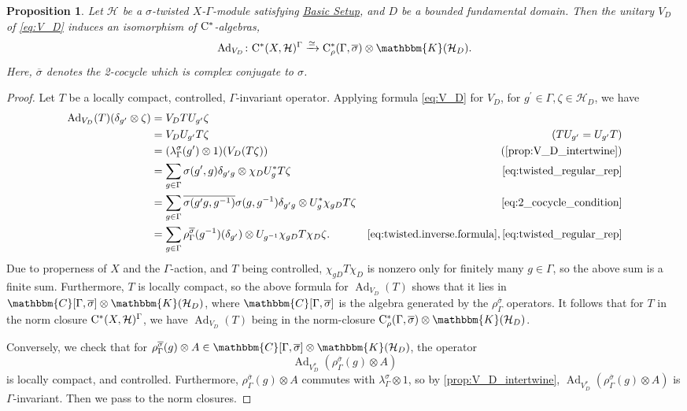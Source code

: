 \documentclass{amsart}
\numberwithin{figure}{section}
\numberwithin{equation}{section}
\numberwithin{table}{section}
\theoremstyle{plain}
\newtheorem{proposition}[equation]{Proposition}
\theoremstyle{definition}
\theoremstyle{remark}
\theoremstyle{nonumber}
\newcommand{\refbasicsetup}{\hyperref[basic_setup]{Basic Setup}}
\newcommand{\Cpt}{\mathbb{K}}
\newcommand{\Cst}{\relax\ifmmode\mathrm{C}^*\else\textup{C*}\fi}
\newcommand{\Cstr}{\Cst_\rho} %
\newcommand{\Ad}{\operatorname{Ad}} %
\renewcommand{\mathbb}{\mathbbm} %
\begin{document}
\begin{proposition}\label{prop:twisted_Willett}
Let $\mathcal{H}$ be a
$\sigma$-twisted $X$-$\Gamma$-module satisfying \refbasicsetup, 
and $D$ be a bounded fundamental domain. Then the unitary $V_D$ of
\eqref{eq:V_D}
induces an isomorphism of $\Cst$-algebras,
\begin{equation}\label{eq:Willett_isomorphism_twisted}
\Ad_{V_D}\colon \Cst(X,\mathcal{H})^\Gamma\xrightarrow{\simeq}
\Cstr(\Gamma,\overline{\sigma})\otimes\Cpt(\mathcal{H}_{D}).
\end{equation}
Here, $\overline{\sigma}$ denotes the 2-cocycle which is complex conjugate to $\sigma$.
\end{proposition}
\begin{proof}
Let $T$ be a locally compact, controlled, $\Gamma$-invariant operator.
Applying formula \eqref{eq:V_D} for $V_D$, for $g^\prime\in \Gamma,
\zeta\in \mathcal{H}_D$, we have
\begin{align*}
\Ad_{V_D}(T)(\delta_{g^\prime}\otimes\zeta)
&=V_D T U_{g^\prime}\zeta\\
&=V_D U_{g^\prime} T\zeta & (TU_{g^\prime}=U_{g^\prime}T)\\
&=(\lambda^\sigma_\Gamma(g^\prime)\otimes 1)(V_D(T\zeta)) &
(\text{\cref{prop:V_D_intertwine}})\\
&=\sum_{g\in \Gamma}\sigma(g^\prime,g)\delta_{g^\prime g}\otimes \chi_D
U_g^* T\zeta & \eqref{eq:twisted_regular_rep}\\
&=\sum_{g\in \Gamma}\overline{\sigma(g^\prime
g,g^{-1})}\sigma(g,g^{-1})\delta_{g^\prime g}\otimes U_g^*\chi_{gD}  T\zeta
& \eqref{eq:2_cocycle_condition}\\
&=\sum_{g\in
\Gamma}\rho_\Gamma^{\overline{\sigma}}(g^{-1})(\delta_{g^\prime})\otimes
U_{g^{-1}}\chi_{gD} T\chi_D\zeta. &
\eqref{eq:twisted.inverse.formula},\eqref{eq:twisted_regular_rep}
\end{align*}
Due to properness of $X$ and the $\Gamma$-action, and $T$ being controlled,
$\chi_{gD}T\chi_D$ is nonzero only for finitely many $g\in \Gamma$, so the
above sum is a finite sum. Furthermore, $T$ is locally
compact, so the above formula for $\Ad_{V_D}(T)$ shows that it lies in
$\mathbb{C}[\Gamma,\overline{\sigma}]\otimes \Cpt(\mathcal{H}_D)$, where
$\mathbb{C}[\Gamma,\overline{\sigma}]$ is the algebra generated by the
$\rho_\Gamma^{\overline{\sigma}}$ operators.
It follows that for $T$ in the norm closure $\Cst(X,\mathcal{H})^\Gamma$,
we have $\Ad_{V_D}(T)$ being in the norm-closure
$\Cstr(\Gamma,\overline{\sigma})\otimes \Cpt(\mathcal{H}_D)$.

Conversely, we check that for
$\rho_\Gamma^{\overline{\sigma}}(g)\otimes A\in
\mathbb{C}[\Gamma,\overline{\sigma}]\otimes \Cpt(\mathcal{H}_D)$, the
operator
\[
  \Ad_{V_D^*}(\rho_\Gamma^{\overline{\sigma}}(g)\otimes A)
\]
is locally compact, and controlled. Furthermore,
$\rho_\Gamma^{\overline{\sigma}}(g)\otimes A$ commutes with
$\lambda_\Gamma^{\sigma}\otimes 1$, so by \cref{prop:V_D_intertwine},
$\Ad_{V_D^*}(\rho_\Gamma^{\overline{\sigma}}(g)\otimes A)$ is
$\Gamma$-invariant. Then we pass to the norm closures.
\end{proof}
\end{document}
